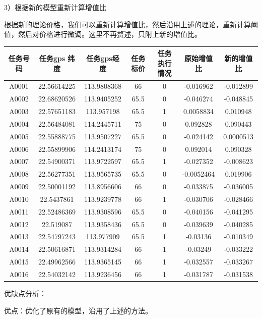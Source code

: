 \documentclass{ctexart}
\begin{document}
3）根据新的模型重新计算增值比

根据新的理论价格，我们可以重新计算增值比，然后沿用上述的理论，重新计算阈值，然后对价格进行微调。这里不再赘述，只附上新的增值比。
\newpage
  \begin{table}[!h]\center\scriptsize
\begin{tabular}{|c|c|c|c|c|c|c|}

\hline
任务号码&	任务gps 纬度&	任务gps经度	&任务标价	&任务执行情况&	原始增值比	&新的增值比\\
\hline
A0001&	22.56614225	&113.9808368	&66	&0	&-0.016962&	-0.012899\\
\hline
A0002&	22.68620526	&113.9405252	&65.5&	0&	-0.046274	&-0.048845\\
\hline
A0003&	22.57651183	&113.957198	&65.5	&1&	0.0058834	&0.010948\\
\hline
A0004&	22.56484081	&114.2445711	&75	&0&	0.092828	&0.090443\\
\hline
A0005&	22.55888775	&113.9507227	&65.5&	0	&-0.024142	&0.0000513\\
\hline
A0006&	22.55899906	&114.2413174	&75	&0&	0.092014&	0.090328\\
\hline
A0007&	22.54900371	&113.9722597	&65.5&	1&	-0.027352&	-0.008623\\
\hline
A0008&	22.56277351	&113.9565735	&65.5&	0&	-0.0052464&	0.019906\\
\hline
A0009&	22.50001192	&113.8956606	&66	&0&	-0.033875&	-0.036005\\
\hline
A0010&	22.5437861	&113.9239778	&66	&1&	-0.030706&	-0.028466\\
\hline
A0011&	22.52486369	&113.9308596	&65.5	&0&	-0.040156	&-0.041295\\
\hline
A0012&  22.519087	&113.9358436	&65.5&	0&	-0.039639&	-0.040285\\
\hline
A0013&	22.54797243	&113.977909	&65.5	&1&	-0.03136	&-0.010349\\
\hline
A0014&	22.50616871	&113.9314284	&66	&1&	-0.03249	&-0.033222\\
\hline
A0015&	22.49962566	&113.9365145	&66	&1&	-0.032557	&-0.033267\\
\hline
A0016&	22.54032142	&113.9236456	&66	&1&	-0.031787	&-0.031538\\
\hline




\end{tabular}
\end{table}


 优缺点分析：

优点：优化了原有的模型，沿用了上述的方法。
\end{document}
